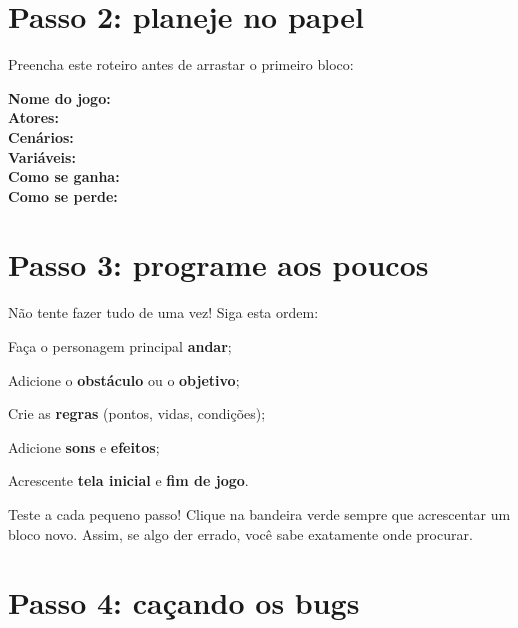 \section{Passo 2: planeje no papel}

Preencha este roteiro antes de arrastar o primeiro bloco:

\begin{definicao}
\textbf{Nome do jogo:} \underline{\hspace{8cm}}\\[4pt]
\textbf{Atores:} \underline{\hspace{9cm}}\\[4pt]
\textbf{Cenários:} \underline{\hspace{9cm}}\\[4pt]
\textbf{Variáveis:} \underline{\hspace{9cm}}\\[4pt]
\textbf{Como se ganha:} \underline{\hspace{8cm}}\\[4pt]
\textbf{Como se perde:} \underline{\hspace{8cm}}
\end{definicao}

\section{Passo 3: programe aos poucos}

Não tente fazer tudo de uma vez! Siga esta ordem:

\begin{passos}
\item Faça o personagem principal \textbf{andar};
\item Adicione o \textbf{obstáculo} ou o \textbf{objetivo};
\item Crie as \textbf{regras} (pontos, vidas, condições);
\item Adicione \textbf{sons} e \textbf{efeitos};
\item Acrescente \textbf{tela inicial} e \textbf{fim de jogo}.
\end{passos}

\begin{dica}
Teste a cada pequeno passo! Clique na bandeira verde sempre que acrescentar um bloco novo. Assim, se algo der errado, você sabe exatamente onde procurar.
\end{dica}

\section{Passo 4: caçando os bugs}

